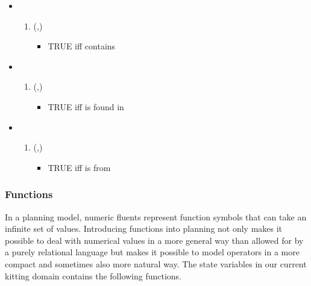 \begin{itemize}
\item {}
    \begin{enumerate}[resume]
        \item {}(,) 
            \begin{itemize}
                \item TRUE iff  contains 
            \end{itemize}
    \end{enumerate}

\item {}
    \begin{enumerate}[resume]
        \item {}(,) 
            \begin{itemize}
                \item TRUE iff  is found in 
            \end{itemize}
  \end{enumerate}

\item {}
    \begin{enumerate}[resume]
        \item {}(,) 
            \begin{itemize}
                \item TRUE iff  is from 
            \end{itemize}
    \end{enumerate}
\end{itemize}

\subsubsection{Functions}
In a planning model, numeric fluents represent function symbols that can take an infinite
set of values. Introducing functions into planning not only makes it possible to deal with numerical
values in a more general way than allowed for by a purely relational language but makes it possible to model operators in a more compact and sometimes also more natural way. The state variables in our current kitting domain contains the following functions.

